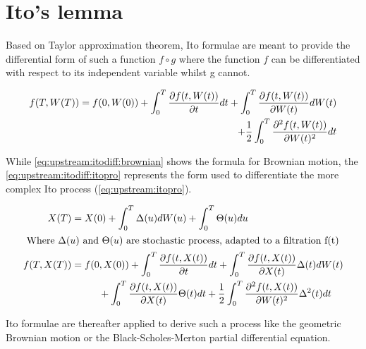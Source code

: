 \documentclass[a4paper, 12pt]{report}
\begin{document}
\section{Ito's lemma}
\label{sec:upstream:ito}

Based on Taylor approximation theorem, Ito formulae are meant to provide the differential form of such a function $f \circ g$ where the function $f$ can be differentiated with respect to its independent variable whilst g cannot.

\begin{align}
  f(T, W(T)) = f(0, W(0))
               + \int_0^T \frac{\partial f(t, W(t))}{\partial t} dt
               + \int_0^T \frac{\partial f(t, W(t))}{\partial W(t)} dW(t)\notag\\
    \mspace{150mu} + \frac{1}{2} \int_0^T \frac{\partial^2 f(t, W(t))}{\partial W(t)^2} dt \label{eq:upstream:itodiff:brownian}
\end{align}

While \cref{eq:upstream:itodiff:brownian} shows the formula for Brownian motion, the \cref{eq:upstream:itodiff:itopro} represents the form used to differentiate the more complex Ito process (\ref{eq:upstream:itopro}).

\begin{align}
  X(T) &= X(0)
         + \int_0^T \Delta(u) dW(u)
         + \int_0^T \Theta(u) du \label{eq:upstream:itopro} \\
  \intertext{
  Where $\Delta(u)$ and $\Theta(u)$ are stochastic process, adapted to a filtration f(t)
  }
  f(T, X(T)) &= f(0, X(0))
               + \int_0^T \frac{\partial f(t, X(t))}{\partial t} dt
               + \int_0^T \frac{\partial f(t, X(t))}{\partial X(t)} \Delta(t) dW(t)\notag\\
    &\mspace{50mu} + \int_0^T \frac{\partial f(t, X(t))}{\partial X(t)} \Theta(t) dt
    + \frac{1}{2} \int_0^T \frac{\partial^2 f(t, X(t))}{\partial W(t)^2} \Delta^2(t)dt \label{eq:upstream:itodiff:itopro}
\end{align}

Ito formulae are thereafter applied to derive such a process like the geometric Brownian motion or the Black-Scholes-Merton partial differential equation. 







\end{document}

